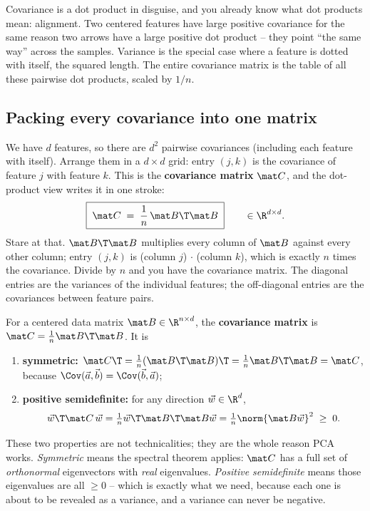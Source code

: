 \begin{intuitionbox}
Covariance is a dot product in disguise, and you already know what dot products
mean: alignment. Two centered features have large positive covariance for the same
reason two arrows have a large positive dot product -- they point ``the same way''
across the samples. Variance is the special case where a feature is dotted with
itself, the squared length. The entire covariance matrix is the table of all these
pairwise dot products, scaled by $1/n$.
\end{intuitionbox}

\subsection{Packing every covariance into one matrix}

We have $d$ features, so there are $d^2$ pairwise covariances (including each
feature with itself). Arrange them in a $d\times d$ grid: entry $(j,k)$ is the
covariance of feature $j$ with feature $k$. This is the \textbf{covariance matrix}
$\mat C$, and the dot-product view writes it in one stroke:
\[
  \boxed{\;\mat C \;=\; \frac{1}{n}\,\mat B\T \mat B\;}
  \qquad\in\R^{d\times d}.
\]
Stare at that. $\mat B\T\mat B$ multiplies every column of $\mat B$ against every
other column; entry $(j,k)$ is (column $j$) $\cdot$ (column $k$), which is exactly
$n$ times the covariance. Divide by $n$ and you have the covariance matrix. The
diagonal entries are the variances of the individual features; the off-diagonal
entries are the covariances between feature pairs.

\begin{formalbox}
For a centered data matrix $\mat B\in\R^{n\times d}$, the \textbf{covariance
matrix} is $\mat C=\tfrac1n\mat B\T\mat B$. It is
\begin{enumerate}
  \item \textbf{symmetric:} $\mat C\T=\tfrac1n(\mat B\T\mat B)\T=\tfrac1n\mat B\T\mat B=\mat C$,
        because $\Cov(\vec a,\vec b)=\Cov(\vec b,\vec a)$;
  \item \textbf{positive semidefinite:} for any direction $\vec w\in\R^d$,
        \[
          \vec w\T\mat C\,\vec w=\tfrac1n\vec w\T\mat B\T\mat B\vec w
          =\tfrac1n\norm{\mat B\vec w}^2\;\ge\;0 .
        \]
\end{enumerate}
\end{formalbox}

These two properties are not technicalities; they are the whole reason PCA works.
\emph{Symmetric} means the spectral theorem applies: $\mat C$ has a full set of
\emph{orthonormal} eigenvectors with \emph{real} eigenvalues. \emph{Positive
semidefinite} means those eigenvalues are all $\ge 0$ -- which is exactly what we
need, because each one is about to be revealed as a variance, and a variance can
never be negative.

